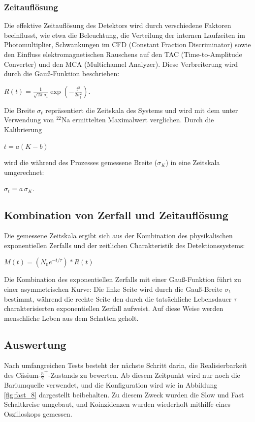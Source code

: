 \subsubsection{Zeitauflösung}

Die effektive Zeitauflösung des Detektors wird durch verschiedene Faktoren beeinflusst, wie etwa die Beleuchtung, die Verteilung der internen Laufzeiten im Photomultiplier, Schwankungen im CFD (Constant Fraction Discriminator) sowie den Einfluss elektromagnetischen Rauschens auf den TAC (Time-to-Amplitude Converter) und den MCA (Multichannel Analyzer). Diese Verbreiterung wird durch die Gauß-Funktion beschrieben:

$
R(t) = \frac{1}{\sqrt{2\pi}\sigma_t}
\exp\!\left(-\frac{t^2}{2\sigma_t^2}\right).
$

Die Breite $\sigma_t$ repräsentiert die Zeitskala des Systems und wird mit dem unter Verwendung von $^{22}$Na ermittelten Maximalwert verglichen. Durch die Kalibrierung

$t = a(K - b)$

wird die während des Prozesses gemessene Breite ($\sigma_K$) in eine Zeitskala umgerechnet:

$\sigma_t = a\,\sigma_K.$

\subsection{Kombination von Zerfall und Zeitauflösung}

Die gemessene Zeitskala ergibt sich aus der Kombination des physikalischen exponentiellen Zerfalls und der zeitlichen Charakteristik des Detektionssystems:

$ M(t) = (N_0 e^{-t/\tau}) * R(t)$

Die Kombination des exponentiellen Zerfalls mit einer Gauß-Funktion führt zu einer asymmetrischen Kurve: Die linke Seite wird durch die Gauß-Breite $\sigma_t$ bestimmt, während die rechte Seite den durch die tatsächliche Lebensdauer $\tau$ charakterisierten exponentiellen Zerfall aufweist. Auf diese Weise werden menschliche Leben aus dem Schatten geholt.

\subsection{Auswertung}
Nach umfangreichen Tests besteht der nächste Schritt darin, die Realisierbarkeit des Cäsium-$\frac{5}{2}^+$-Zustands zu bewerten. Ab diesem Zeitpunkt wird nur noch die Bariumquelle verwendet, und die Konfiguration wird wie in Abbildung \ref{fig:fast_8} dargestellt beibehalten. Zu diesem Zweck wurden die Slow und Fast Schaltkreise umgebaut, und Koinzidenzen wurden wiederholt mithilfe eines Oszilloskops gemessen.

